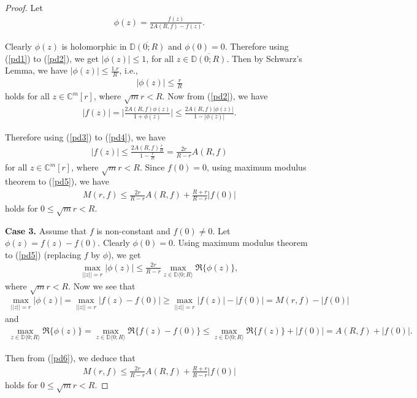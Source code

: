 \documentclass[11pt, reqno]{amsart}
\newcommand{\ol}{\overline}
\numberwithin{equation}{section}
\begin{document}
\begin{proof}
Let 
\begin{align}\label{pd2} 
\phi(z)=\frac{f(z)}{2A(R,f)-f(z)}.
\end{align}

Clearly $\phi(z)$ is holomorphic in $\ol{\mathbb{D}(0;R)}$ and $\phi(0)=0$. Therefore using (\ref{pd1}) to (\ref{pd2}), we get $|\phi(z)|\leq 1$, for all $z\in \ol{\mathbb{D}(0;R)}$. Then by Schwarz's Lemma, we have $|\phi(z)|\leq \frac{1.r}{R}$, i.e., 
\begin{align}\label{pd3}
|\phi(z)|\leq \frac{r}{R}
\end{align}
holds for all $z\in\mathbb{C}^m[r]$, where $\sqrt{m}r<R$. Now from (\ref{pd2}), we have 
\begin{align}\label{pd4} 
|f(z)|=\Big|\frac{2A(R,f)\phi(z)}{1+\phi(z)}\Big|\leq \frac{2A(R,f)|\phi(z)|}{1-|\phi(z)|}.
\end{align}

Therefore using (\ref{pd3}) to (\ref{pd4}), we have
\begin{align}\label{pd5} 
|f(z)|\leq \frac{2A(R,f)\frac{r}{R}}{1-\frac{r}{R}}=\frac{2r}{R-r}A(R,f)
\end{align}
for all $z\in\mathbb{C}^m[r]$, where $\sqrt{m}r<R$. Since $f(0)=0$, using maximum modulus theorem to (\ref{pd5}), we have 
\begin{align*}
 M(r,f)\leq \frac{2r}{R-r}A(R,f)+\frac{R+r}{R-r}|f(0)|
 \end{align*}
holds for $0\leq \sqrt{m}r<R$.\vspace{1.2mm}

{\bf Case 3.} Assume that $f$ is non-constant and $f(0)\not=0$. Let $\phi(z)=f(z)-f(0)$. Clearly $\phi(0)=0$. Using maximum modulus theorem to (\ref{pd5}) (replacing $f$ by $\phi$), we get
\begin{align}\label{pd6} 
\max\limits_{||z||=r}|\phi(z)|\leq \frac{2r}{R-r}\max\limits_{z\in \mathbb{D}\langle 0;R\rangle}\Re\{\phi(z)\},
\end{align}
where $\sqrt{m}r<R$. Now we see that
\begin{align*}
 \max\limits_{||z||=r}|\phi(z)|=\max\limits_{||z||=r}|f(z)-f(0)|\geq \max\limits_{||z||=r}|f(z)|-|f(0)|=M(r,f)-|f(0)|
 \end{align*}
and 
\begin{align*}
 \max\limits_{z\in \mathbb{D}\langle 0;R\rangle}\Re\{\phi(z)\}=\max\limits_{z\in \mathbb{D}\langle 0;R\rangle}\Re\{f(z)-f(0)\}\leq \max\limits_{z\in \mathbb{D}\langle 0;R\rangle}\Re\{f(z)\}+|f(0)|=A(R,f)+|f(0)|.
 \end{align*}

Then from (\ref{pd6}), we deduce that 
\begin{align*}
 M(r,f)\leq \frac{2r}{R-r}A(R,f)+\frac{R+r}{R-r}|f(0)|
 \end{align*}
holds for $0\leq \sqrt{m}r<R$.
\end{proof}
\end{document}
